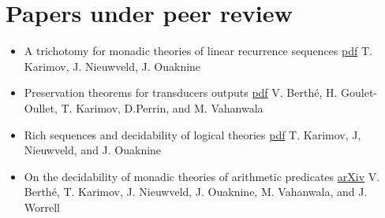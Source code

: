 \documentclass{article}
\begin{document}
	\section*{Papers under peer review}
	\begin{itemize}
		
		\item
		{\large A trichotomy for monadic theories of
			linear recurrence sequences}
		\href{https://toghrul-karimov.github.io/assets/papers/trichotomy.pdf}{pdf}
		\vspace{0.2cm} \newline
		T. Karimov, J. Nieuwveld, J. Ouaknine
		\vspace*{0.2cm}

		
		\item 
		{\large Preservation theorems for transducers outputs}
		\href{https://toghrul-karimov.github.io/assets/papers/preservation-theorems.pdf}{pdf}
		\vspace{0.2cm} \newline
		V. Berth\'e, H. Goulet-Oullet, T. Karimov, D.Perrin, and M. Vahanwala
		\vspace*{0.2cm}
		
		\item 
		{\large *Rich sequences and decidability of logical theories}
		\href{https://toghrul-karimov.github.io/assets/papers/rich-sequences.pdf}{pdf}
		\vspace{0.2cm} \newline
		T. Karimov, J, Nieuwveld, and J. Ouaknine
		\vspace*{0.2cm}
		
		\item
		{\large On the decidability of monadic theories of arithmetic predicates
		}
		\href{https://arxiv.org/abs/2405.07953}{arXiv}
		\vspace{0.2cm} \newline
		V. Berth\'e, T. Karimov, J. Nieuwveld, J. Ouaknine, M. Vahanwala, and J. Worrell
		\vspace*{0.2cm}
	\end{itemize}
\end{document}
